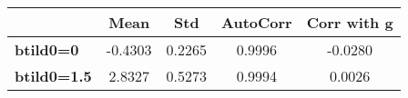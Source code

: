 \begin{tiny}\begin{tabular}{|l|c|c|c|c|}
\hline
&\textbf{Mean}&\textbf{Std}&\textbf{AutoCorr}&\textbf{Corr with g}\\\hline
\textbf{btild0=0}&-0.4303&0.2265&0.9996&-0.0280\\\hline
\textbf{btild0=1.5}&2.8327&0.5273&0.9994&0.0026\\\hline
\end{tabular}
\end{tiny}